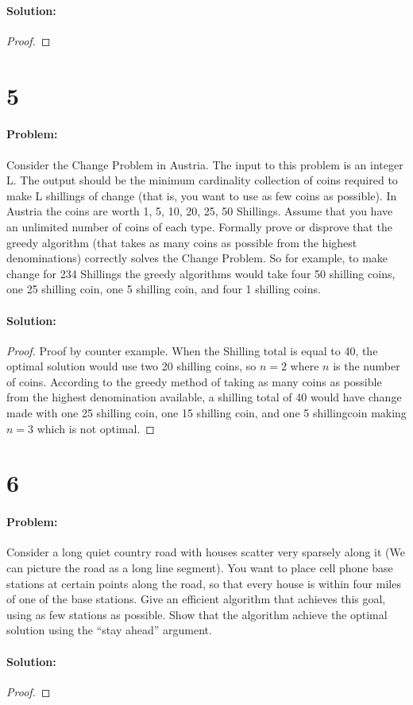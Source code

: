 \documentclass[12pt]{article}
\begin{document}
\paragraph{Solution:}
\begin{proof}
\end{proof}

\section{5}
\paragraph{Problem:}
Consider the Change Problem in Austria. The input to this problem is
an integer L. The output should be the minimum cardinality collection
of coins required to make L shillings of change (that is, you want to use
as few coins as possible). In Austria the coins are worth 1, 5, 10, 20, 25,
50 Shillings. Assume that you have an unlimited number of coins of each
type. Formally prove or disprove that the greedy algorithm (that takes as
many coins as possible from the highest denominations) correctly solves
the Change Problem. So for example, to make change for 234 Shillings the
greedy algorithms would take four 50 shilling coins, one 25 shilling coin,
one 5 shilling coin, and four 1 shilling coins.
\paragraph{Solution:}
\begin{proof}
Proof by counter example.
When the Shilling total is equal to 40, the optimal solution would use two 20 shilling coins, so $n=2$ where $n$ is the number of coins.  According to the greedy method of taking as many coins as possible from the highest denomination available, a shilling total of 40 would have change made with one 25 shilling coin, one 15 shilling coin, and one 5 shillingcoin making $n=3$ which is not optimal.
\end{proof}

\section{6}
\paragraph{Problem:}
Consider a long quiet country road with houses scatter very sparsely along
it (We can picture the road as a long line segment). You want to place cell
phone base stations at certain points along the road, so that every house
is within four miles of one of the base stations.
Give an efficient algorithm that achieves this goal, using as few stations
as possible. Show that the algorithm achieve the optimal solution using
the “stay ahead” argument.
\paragraph{Solution:}
\begin{proof}

\end{proof}
\end{document}
